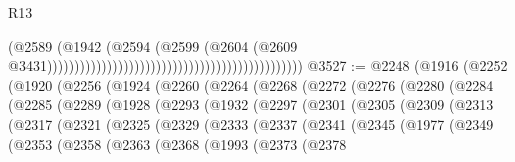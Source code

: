 \begin{lexlean}{R13}
\begin{coremodule}
                                                                                      (@2589
                                                                                        (@1942
                                                                                          (@2594
                                                                                            (@2599
                                                                                              (@2604
                                                                                                (@2609
                                                                                                  @3431)))))))))))))))))))))))))))))))))))))))))))))))
@3527 := @2248
    (@1916
      (@2252
        (@1920
          (@2256
            (@1924
              (@2260
                (@2264
                  (@2268
                    (@2272
                      (@2276
                        (@2280
                          (@2284
                            (@2285
                              (@2289
                                (@1928
                                  (@2293
                                    (@1932
                                      (@2297
                                        (@2301
                                          (@2305
                                            (@2309
                                              (@2313
                                                (@2317
                                                  (@2321
                                                    (@2325
                                                      (@2329
                                                        (@2333
                                                          (@2337
                                                            (@2341
                                                              (@2345
                                                                (@1977
                                                                  (@2349
                                                                    (@2353
                                                                      (@2358
                                                                        (@2363
                                                                          (@2368
                                                                            (@1993
                                                                              (@2373
                                                                                (@2378

\end{coremodule}
\end{lexlean}
